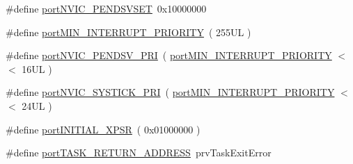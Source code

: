 \begin{DoxyCompactItemize}
\item 
\#define \mbox{\hyperlink{thirdparty_2freertos_2freertos-10_80_80_2_source_2portable_2_g_c_c_2_a_r_m___c_m0_2port_8c_a1428ef16ad26ab8c4d4172aedb8c019b}{port\+N\+V\+I\+C\+\_\+\+P\+E\+N\+D\+S\+V\+S\+ET}}~0x10000000
\item 
\#define \mbox{\hyperlink{thirdparty_2freertos_2freertos-10_80_80_2_source_2portable_2_g_c_c_2_a_r_m___c_m0_2port_8c_a7695fa51586f81228c89bcf517ec44f3}{port\+M\+I\+N\+\_\+\+I\+N\+T\+E\+R\+R\+U\+P\+T\+\_\+\+P\+R\+I\+O\+R\+I\+TY}}~( 255\+U\+L )
\item 
\#define \mbox{\hyperlink{thirdparty_2freertos_2freertos-10_80_80_2_source_2portable_2_g_c_c_2_a_r_m___c_m0_2port_8c_a71a0b2492ed73217b5864c1e3ba8c9be}{port\+N\+V\+I\+C\+\_\+\+P\+E\+N\+D\+S\+V\+\_\+\+P\+RI}}~( \mbox{\hyperlink{thirdparty_2freertos_2freertos-10_80_80_2_source_2portable_2_g_c_c_2_a_r_m___c_m0_2port_8c_a7695fa51586f81228c89bcf517ec44f3}{port\+M\+I\+N\+\_\+\+I\+N\+T\+E\+R\+R\+U\+P\+T\+\_\+\+P\+R\+I\+O\+R\+I\+TY}} $<$$<$ 16\+U\+L )
\item 
\#define \mbox{\hyperlink{thirdparty_2freertos_2freertos-10_80_80_2_source_2portable_2_g_c_c_2_a_r_m___c_m0_2port_8c_ae4ddaa528bc05260d1a5a607c8a00d9f}{port\+N\+V\+I\+C\+\_\+\+S\+Y\+S\+T\+I\+C\+K\+\_\+\+P\+RI}}~( \mbox{\hyperlink{thirdparty_2freertos_2freertos-10_80_80_2_source_2portable_2_g_c_c_2_a_r_m___c_m0_2port_8c_a7695fa51586f81228c89bcf517ec44f3}{port\+M\+I\+N\+\_\+\+I\+N\+T\+E\+R\+R\+U\+P\+T\+\_\+\+P\+R\+I\+O\+R\+I\+TY}} $<$$<$ 24\+U\+L )
\item 
\#define \mbox{\hyperlink{thirdparty_2freertos_2freertos-10_80_80_2_source_2portable_2_g_c_c_2_a_r_m___c_m0_2port_8c_a062d03aca8ae932b4552a2aa19853b44}{port\+I\+N\+I\+T\+I\+A\+L\+\_\+\+X\+P\+SR}}~( 0x01000000 )
\item 
\#define \mbox{\hyperlink{thirdparty_2freertos_2freertos-10_80_80_2_source_2portable_2_g_c_c_2_a_r_m___c_m0_2port_8c_a254a1ddd7499c6ec36b38e2fc3486b80}{port\+T\+A\+S\+K\+\_\+\+R\+E\+T\+U\+R\+N\+\_\+\+A\+D\+D\+R\+E\+SS}}~prv\+Task\+Exit\+Error
\end{DoxyCompactItemize}
